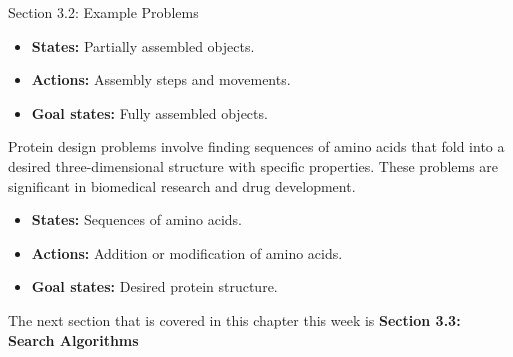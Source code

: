 \begin{notes}{Section 3.2: Example Problems}
\begin{highlight}
        \begin{itemize}
            \item \textbf{States:} Partially assembled objects.
            \item \textbf{Actions:} Assembly steps and movements.
            \item \textbf{Goal states:} Fully assembled objects.
        \end{itemize}
    \end{highlight}

    \begin{highlight}
        Protein design problems involve finding sequences of amino acids that fold into a desired three-dimensional structure with specific properties. These problems are significant in biomedical 
        research and drug development.
    
        \begin{itemize}
            \item \textbf{States:} Sequences of amino acids.
            \item \textbf{Actions:} Addition or modification of amino acids.
            \item \textbf{Goal states:} Desired protein structure.
        \end{itemize}
    \end{highlight}
\end{notes}

The next section that is covered in this chapter this week is \textbf{Section 3.3: Search Algorithms}

